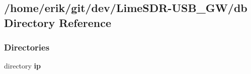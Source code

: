 \subsection{/home/erik/git/dev/\+Lime\+S\+D\+R-\/\+U\+S\+B\+\_\+\+G\+W/db Directory Reference}
\label{dir_6b7ead78b2d858df6dea3b2ba701b685}
\subsubsection*{Directories}
\begin{DoxyCompactItemize}
\item 
directory {\bf ip}
\end{DoxyCompactItemize}
